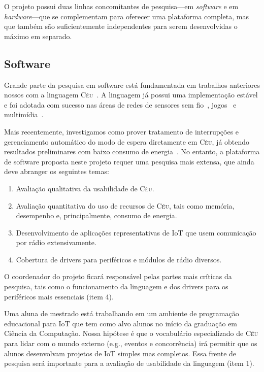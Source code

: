\documentclass[titlepage,12pt]{article}
\newcommand{\CEU}{\textsc{C\'{e}u}\xspace}
\begin{document}
O projeto possui duas linhas concomitantes de pesquisa---em \emph{software} e
em \emph{hardware}---que se complementam para oferecer uma plataforma completa,
mas que também são suficientemente independentes para serem desenvolvidas o
máximo em separado.

\subsection{Software}
\label{sec.metodologia.software}

Grande parte da pesquisa em software está fundamentada em trabalhos anteriores
nossos com a linguagem \CEU~\cite{ceu.sensys13,ceu.tecs17,ceu.lctes18}.
A linguagem já possui uma implementação estável e foi adotada com sucesso nas
áreas de redes de sensores sem fio~\cite{ceu.sensys13,ceu.terra},
jogos~\cite{ceu.mod15} e multimídia~\cite{ceumedia.webmedia16}.

Mais recentemente, investigamos como prover tratamento de interrupções e
gerenciamento automático do modo de espera diretamente em \CEU, já obtendo
resultados preliminares com baixo consumo de energia~\cite{ceu.lctes18.short}.
%
No entanto, a plataforma de software proposta neste projeto requer uma pesquisa
mais extensa, que ainda deve abranger os seguintes temas:
%
\begin{enumerate}
\item Avaliação qualitativa da usabilidade de \CEU.
\item Avaliação quantitativa do uso de recursos de \CEU, tais como memória,
      desempenho e, principalmente, consumo de energia.
\item Desenvolvimento de aplicações representativas de IoT que usem comunicação
      por rádio extensivamente.
\item Cobertura de drivers para periféricos e módulos de rádio diversos.
\end{enumerate}

O coordenador do projeto ficará responsável pelas partes mais críticas da
pesquisa, tais como o funcionamento da linguagem e dos drivers para os
periféricos mais essenciais (item 4).

Uma aluna de mestrado está trabalhando em um ambiente de programação
educacional para IoT que tem como alvo alunos no início da graduação em Ciência
da Computação.
Nossa hipótese é que o vocabulário especializado de \CEU para lidar com o mundo
externo (e.g., eventos e concorrência) irá permitir que os alunos desenvolvam
projetos de IoT simples mas completos.
Essa frente de pesquisa será importante para a avaliação de usabilidade da
linguagem (item 1).
\end{document}
